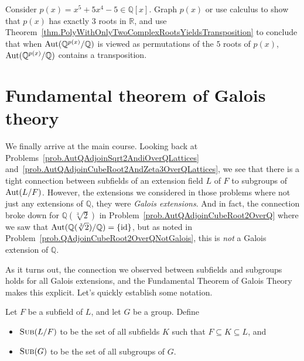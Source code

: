 \begin{problem}\label{prob.AutSplittingFieldx55x45ContainsTransposition}
Consider $p(x) = x^5 +5x^4-5 \in \mathbb{Q}[x]$. Graph $p(x)$ or use calculus to show that $p(x)$ has exactly $3$ roots  in $\mathbb{R}$, and use Theorem~\ref{thm.PolyWithOnlyTwoComplexRootsYieldsTransposition} to conclude that when $\operatorname{Aut}(\mathbb{Q}^{p(x)}/\mathbb{Q})$ is viewed as permutations of the $5$ roots of $p(x)$, $\operatorname{Aut}(\mathbb{Q}^{p(x)}/\mathbb{Q})$ contains a transposition.
\end{problem}

\section{Fundamental theorem of Galois theory}

We finally arrive at the main course. Looking back at Problems~\ref{prob.AutQAdjoinSqrt2AndiOverQLattices} and~\ref{prob.AutQAdjoinCubeRoot2AndZeta3OverQLattices}, we see that there is a tight connection between subfields of an extension  field $L$ of $F$ to subgroups of $\operatorname{Aut}(L/F)$. However, the extensions we considered in those problems where not just any extensions of $\mathbb{Q}$, they were \emph{Galois extensions}. And in fact, the connection broke down for $\mathbb{Q}(\sqrt[3]{2})$ in Problem~\ref{prob.AutQAdjoinCubeRoot2OverQ} where we saw that $\operatorname{Aut}(\mathbb{Q}(\sqrt[3]{2})/\mathbb{Q}) = \{\text{id}\}$, but as noted in  Problem~\ref{prob.QAdjoinCubeRoot2OverQNotGalois}, this is \emph{not} a Galois extension of $\mathbb{Q}$. 

As it turns out, the connection we observed between subfields and subgroups holds for all Galois extensions, and the Fundamental Theorem of Galois Theory makes this explicit. Let's quickly establish some notation.

\begin{notation}
Let $F$ be a subfield of $L$, and let $G$ be a group. Define 
\begin{itemize}
\item $\operatorname{\textsc{Sub}}(L/F)$ to be the set of all subfields $K$ such that $F\subseteq K\subseteq L$, and 
\item $\operatorname{\textsc{Sub}}(G)$ to be the set of all subgroups of  $G$.
\end{itemize}
\end{notation}

